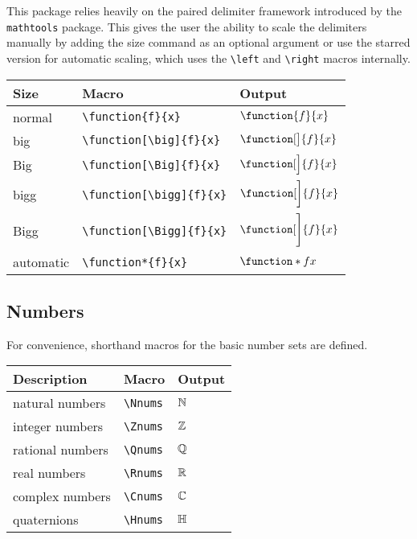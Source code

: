 \documentclass[DIV=13]{scrartcl}
\begin{document}
This package relies heavily on the paired delimiter framework introduced by
the \texttt{mathtools} package. This gives the user the ability to
scale the delimiters manually by adding the size command as an optional
argument or use the starred version for automatic scaling, which uses the
\verb|\left| and \verb|\right| macros internally.
\begin{center}
  \begin{tabular}{lll}
    \toprule
    \textbf{Size} & \textbf{Macro}
                  & \textbf{Output}               \\
    \midrule
    normal        & \verb|\function{f}{x}|
                  & $\function{f}{x}$             \\
    big           & \verb|\function[\big]{f}{x}|
                  & $\function[\big]{f}{x}$       \\
    Big           & \verb|\function[\Big]{f}{x}|
                  & $\function[\Big]{f}{x}$       \\
    bigg          & \verb|\function[\bigg]{f}{x}|
                  & $\function[\bigg]{f}{x}$      \\
    Bigg          & \verb|\function[\Bigg]{f}{x}|
                  & $\function[\Bigg]{f}{x}$      \\
    automatic     & \verb|\function*{f}{x}|
                  & $\function*{f}{x}$            \\
    \bottomrule
  \end{tabular}
\end{center}


\subsection{Numbers}
For convenience, shorthand macros for the basic number sets are defined.
\begin{center}
  \begin{tabular}{lll}
    \toprule
    \textbf{Description} & \textbf{Macro}    & \textbf{Output} \\
    \midrule
    natural numbers      & \verb|\Nnums|     & $\mathbb{N}$        \\
    integer numbers      & \verb|\Znums|     & $\mathbb{Z}$        \\
    rational numbers     & \verb|\Qnums|     & $\mathbb{Q}$        \\
    real numbers         & \verb|\Rnums|     & $\mathbb{R}$        \\
    complex numbers      & \verb|\Cnums|     & $\mathbb{C}$        \\
    quaternions          & \verb|\Hnums|     & $\mathbb{H}$        \\
    \bottomrule
  \end{tabular}
\end{center}
\end{document}
